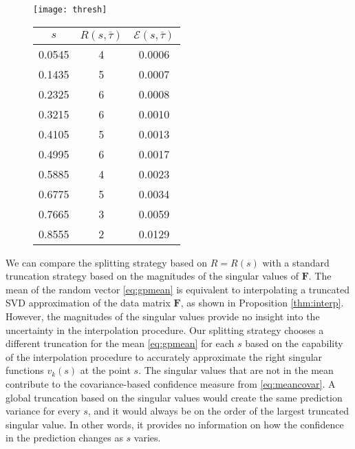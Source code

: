 \documentclass[final]{siamltex}
\providecommand{\mat}[1]{\boldsymbol{#1}}
\providecommand{\mF}{\ensuremath{\mat{F}}}
\begin{document}
\begin{figure}
\begin{minipage}[b]{0.49\textwidth}
  \centering
  \texttt{[image: thresh]}  
  \label{fig:error}
\end{minipage}
\hfill
\begin{minipage}[b]{0.49\textwidth}
\centering
\begin{tabular}{c|c|c}
  $s$ & $R(s,\bar{\tau})$ & ${\mathcal{E}}(s,\bar{\tau})$ \\
  \hline
  0.0545 & 4 & 0.0006\\
  0.1435 & 5 & 0.0007\\
  0.2325 & 6 & 0.0008\\
  0.3215 & 6 & 0.0010\\
  0.4105 & 5  & 0.0013\\
  0.4995 & 6 & 0.0017\\
  0.5885 & 4 & 0.0023\\
  0.6775 & 5 & 0.0034\\
  0.7665 & 3 & 0.0059\\
  0.8555 & 2 & 0.0129
\end{tabular}
\label{tab:thresh}
\end{minipage}
\end{figure}

We can compare the splitting strategy based on $R=R(s)$ with a
standard truncation strategy based on the magnitudes of the singular
values of $\mF$. The mean of the random vector \eqref{eq:gpmean} is
equivalent to interpolating a truncated SVD approximation of the data
matrix $\mF$, as shown in Proposition \ref{thm:interp}. However, the
magnitudes of the singular values provide no insight into the
uncertainty in the interpolation procedure. Our splitting strategy
chooses a different truncation for the mean \eqref{eq:gpmean} for each
$s$ based on the capability of the interpolation procedure to
accurately approximate the right singular functions $v_k(s)$ at the
point $s$. The singular values that are not in the mean contribute to
the covariance-based confidence measure from \eqref{eq:meancovar}. A
global truncation based on the singular values would create the same
prediction variance for every $s$, and it would always be on the order
of the largest truncated singular value. In other words, it provides
no information on how the confidence in the prediction changes as $s$
varies.
\end{document}
